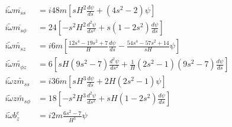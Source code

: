 \begin{equation}
\begin{aligned}\label{eqn:eigen-pgmag-poloidal-dipole}
    i \widetilde{\omega} \overline{m_{ss}} &= i48m \left[ sH^2 \frac{d\psi}{d s} + \left(4 s^{2} - 2\right) \psi\right] \\ 
    i \widetilde{\omega} \overline{m_{s\phi}} &= 24 \left[-s^2 H^{2} \frac{d^{2} \psi}{d s^{2}} + s\left(1-2s^2\right) \frac{d\psi}{d s}\right] \\
    i \widetilde{\omega} \widetilde{m_{sz}} &= i6m \left[\frac{12s^4 - 19s^2 + 7}{H} \frac{d\psi}{d s} - \frac{54s^4 - 57s^2 + 14}{sH} \psi\right] \\
    i \widetilde{\omega} \widetilde{m_{\phi z}} &= 6 \left[sH \left(9 s^{2} - 7\right) \frac{d^{2}\psi}{d s^{2}} + \frac{1}{H}\left(2s^2 - 1\right)\left(9s^2 - 7\right) \frac{d\psi}{d s}\right] \\
    i \widetilde{\omega} \widetilde{zm_{ss}} &= i36 m \left[s H^{3} \frac{d\psi}{d s} + 2H \left(2 s^{2} - 1 \right) \psi\right] \\
    i \widetilde{\omega} \widetilde{zm_{s\phi}} &= 18 \left[- s^2 H^{3} \frac{d^{2}\psi}{d s^{2}} + sH \left(1 - 2s^2\right) \frac{d \psi}{d s} \right] \\
    i \widetilde{\omega} b_{z}^e &= i2m \frac{6s^2 - 7}{H^3} \psi \\

\end{aligned}
\end{equation}
